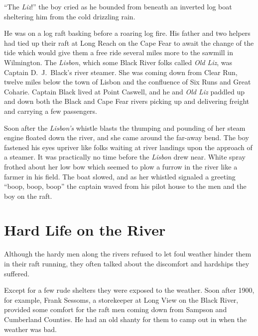 \documentclass[11pt, a5paper, openright]{book}
\begin{document}
``The \textit{Liz}!'' the boy cried as he bounded from beneath an
inverted log boat sheltering him from the cold drizzling rain.\par

He was on a log raft basking before a roaring log fire.  His father
and two helpers had tied up their raft at Long Reach on the Cape Fear
to await the change of the tide which would give them a free ride
several miles more to the sawmill in Wilmington.  The \textit{Lisbon},
which some Black River folks called \textit{Old Liz}, was Captain
D.~J.\ Black's river steamer.  She was
coming down from Clear Run, twelve miles below the town of Lisbon and
the confluence of Six Runs and Great Coharie.  Captain Black lived at
Point Caswell, and he and \textit{Old Liz} paddled up and down both
the Black and Cape Fear rivers picking up and delivering freight and
carrying a few passengers.\par

Soon after the \textit{Lisbon's} whistle blasts the thumping and
pounding of her steam engine floated down the river, and she came
around the far-away bend.  The boy fastened his eyes upriver like
folks waiting at river landings upon the approach of a steamer.  It
was practically no time before the \textit{Lisbon} drew near.  White
spray frothed about her low bow which seemed to plow a furrow in the
river like a farmer in his field.  The boat slowed, and as her
whistled signaled a greeting ``boop, boop, boop'' the captain waved
from his pilot house to the men and the boy on the raft.\par

\section{Hard Life on the River}

Although the hardy men along the rivers refused to let foul weather
hinder them in their raft running, they often talked about the
discomfort and hardships they suffered.\par

Except for a few rude shelters they were exposed to the weather.  Soon
after 1900, for example, Frank Sessoms, a storekeeper at Long View on
the Black River, provided some comfort for the raft men coming down
from Sampson and Cumberland Counties.  He had an old shanty for them
to camp out in when the weather was bad.  \citep[]{rawlsgw}\par
\end{document}
